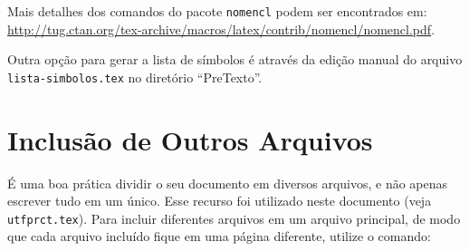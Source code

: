 
Mais detalhes dos comandos do pacote \texttt{nomencl} podem ser encontrados em: \url{http://tug.ctan.org/tex-archive/macros/latex/contrib/nomencl/nomencl.pdf}.

Outra opção para gerar a lista de símbolos é através da edição manual do arquivo \texttt{lista-simbolos.tex} no diretório ``PreTexto''.

\section{Inclusão de Outros Arquivos}\label{sec:inclusao}

É uma boa prática dividir o seu documento em diversos arquivos, e não apenas escrever tudo em um único. Esse recurso foi utilizado neste documento (veja \texttt{utfprct.tex}). Para incluir diferentes arquivos em um arquivo principal, de modo que cada arquivo incluído fique em uma página diferente, utilize o comando:

